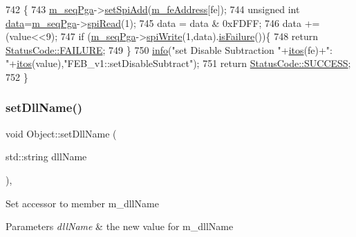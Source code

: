 \begin{DoxyCode}
742                                                          \{
743   \hyperlink{classFEB__v1_a6c7804ac86796f233a8393043adf2e77}{m\_seqPga}->\hyperlink{classSeqPGA_ac998ce3a6d9b5f2e88cc8393f8c1df53}{setSpiAdd}(\hyperlink{classFEB__v1_a4e1945c2d5b434125f375e9d0fc6d99f}{m\_feAddress}[fe]);
744   \textcolor{keywordtype}{unsigned} \textcolor{keywordtype}{int} \hyperlink{classFEB__v1_a6bca4320bd3bbbc32efc81097f33421a}{data}=\hyperlink{classFEB__v1_a6c7804ac86796f233a8393043adf2e77}{m\_seqPga}->\hyperlink{classSeqPGA_ab3d0e5e5d4014bc7a92588a76b8713d4}{spiRead}(1);
745   data = data & 0xFDFF;
746   data += (value<<9);
747   \textcolor{keywordflow}{if} (\hyperlink{classFEB__v1_a6c7804ac86796f233a8393043adf2e77}{m\_seqPga}->\hyperlink{classSeqPGA_ad4421841ce4ce8b88ad13f63216f0743}{spiWrite}(1,data).\hyperlink{classStatusCode_a5dd22dc6eb2c52fc4cabc58f6dea2eb7}{isFailure}())\{
748     \textcolor{keywordflow}{return} \hyperlink{classStatusCode_a6f565cbeadc76d14c72f047e5e85eb4ba3da73d4c469762eb9d3c960368252b26}{StatusCode::FAILURE};
749   \}
750   \hyperlink{classObject_a644fd329ea4cb85f54fa6846484b84a8}{info}(\textcolor{stringliteral}{"set Disable Subtraction "}+\hyperlink{Tools_8h_af330027dbdafb9a30768b3613c553e60}{itos}(fe)+\textcolor{stringliteral}{": "}+\hyperlink{Tools_8h_af330027dbdafb9a30768b3613c553e60}{itos}(value),\textcolor{stringliteral}{"FEB\_v1::setDisableSubtract"});
751   \textcolor{keywordflow}{return} \hyperlink{classStatusCode_a6f565cbeadc76d14c72f047e5e85eb4badd0da38d3ba0d922efd1f4619bc37ad8}{StatusCode::SUCCESS};
752 \}
\end{DoxyCode}
\mbox{\label{classObject_a870c5af919958c2136623b2d7816d123}} 
\subsubsection{\texorpdfstring{set\+Dll\+Name()}{setDllName()}}
{\footnotesize\ttfamily void Object\+::set\+Dll\+Name (\begin{DoxyParamCaption}\item[{std\+::string}]{dll\+Name }\end{DoxyParamCaption})\hspace{0.3cm}{\ttfamily [inline]}, {\ttfamily [inherited]}}

Set accessor to member m\+\_\+dll\+Name 
\begin{DoxyParams}{Parameters}
{\em dll\+Name} & the new value for m\+\_\+dll\+Name \\
\hline
\end{DoxyParams}


